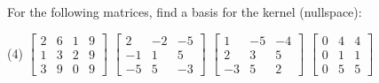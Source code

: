 \begin{exercise}
For the following matrices, find a basis for the kernel (nullspace):
\begin{tasks}(4)
\task
$\begin{bmatrix}
2 & 6 & 1 & 9 \\
1 & 3 & 2 & 9 \\
3 & 9 & 0 & 9
\end{bmatrix}$
\task
$
\begin{bmatrix}
2 & -2 & -5 \\
-1 & 1 & 5 \\
-5 & 5 & -3
\end{bmatrix}$
\task
$
\begin{bmatrix}
1 & -5 & -4 \\
2 & 3 & 5 \\
-3 & 5 & 2
\end{bmatrix}$
\task
$
\begin{bmatrix}
0 & 4 & 4 \\
0 & 1 & 1 \\
0 & 5 & 5
\end{bmatrix}$
\end{tasks}
\end{exercise}

